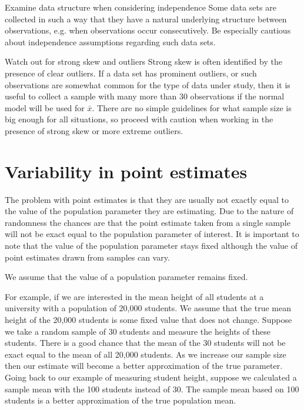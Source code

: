 
\begin{caution}
{Examine data structure when considering independence}
{Some data sets are collected in such a way that they have a natural underlying structure between observations, e.g. when observations occur consecutively. Be especially cautious about independence assumptions regarding such data sets.}
\end{caution}

\begin{caution}
{Watch out for strong skew and outliers}
{Strong skew is often identified by the presence of clear outliers. If a data set has prominent outliers, or such observations are somewhat common for the type of data under study, then it is useful to collect a sample with many more than 30 observations if the normal model will be used for $\bar{x}$. There are no simple guidelines for what sample size is big enough for all situations, so proceed with caution when working in the presence of strong skew or more extreme outliers.}
\end{caution}





\section{Variability in point estimates}
\label{variabilityInEstimates}

The problem with point estimates is that they are usually not exactly equal to 
the value of the population parameter they are estimating.
Due to the nature of randomness the chances are that the point estimate taken from
a single sample will not be exact equal to the population parameter of interest.
It is important to note that the value of the population parameter stays fixed although
the value of point estimates drawn from samples can vary.

\begin{termBox}{
We assume that the value of a population parameter remains fixed.}
\end{termBox}

For example, if we are interested in the mean height of all students at a university 
with a population of 20,000 students.
We assume that the true mean height of the 20,000 students is some fixed value that does not change.
Suppose we take a random sample of 30 students and measure the heights of these students.
There is a good chance that the mean of the 30 students will not be exact equal
to the mean of all 20,000 students.
As we increase our sample size then our estimate will become a better approximation of the
true parameter.
Going back to our example of measuring student height, suppose we calculated a sample mean
with the 100 students instead of 30. The sample mean based on 100 students is a better
approximation of the true population mean.

